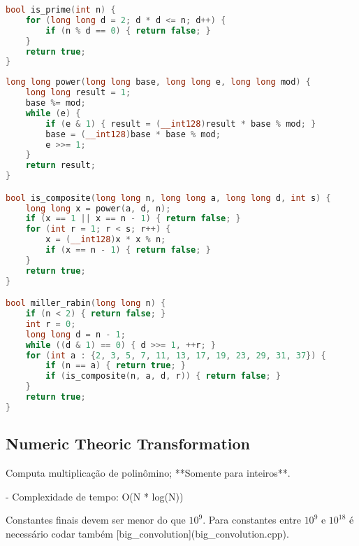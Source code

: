 \documentclass[11pt, a4paper, twoside]{article}
\begin{document}
\begin{multicols}{2}
\begin{lstlisting}[language=C++]
bool is_prime(int n) {
    for (long long d = 2; d * d <= n; d++) {
        if (n % d == 0) { return false; }
    }
    return true;
}
\end{lstlisting}
\end{multicols}

\begin{lstlisting}[language=C++]
long long power(long long base, long long e, long long mod) {
    long long result = 1;
    base %= mod;
    while (e) {
        if (e & 1) { result = (__int128)result * base % mod; }
        base = (__int128)base * base % mod;
        e >>= 1;
    }
    return result;
}

bool is_composite(long long n, long long a, long long d, int s) {
    long long x = power(a, d, n);
    if (x == 1 || x == n - 1) { return false; }
    for (int r = 1; r < s; r++) {
        x = (__int128)x * x % n;
        if (x == n - 1) { return false; }
    }
    return true;
}

bool miller_rabin(long long n) {
    if (n < 2) { return false; }
    int r = 0;
    long long d = n - 1;
    while ((d & 1) == 0) { d >>= 1, ++r; }
    for (int a : {2, 3, 5, 7, 11, 13, 17, 19, 23, 29, 31, 37}) {
        if (n == a) { return true; }
        if (is_composite(n, a, d, r)) { return false; }
    }
    return true;
}
\end{lstlisting}

\subsection{Numeric Theoric Transformation}



Computa multiplicação de polinômino; **Somente para inteiros**.

- Complexidade de tempo: O(N * log(N))

Constantes finais devem ser menor do que $10^9$.  
Para constantes entre $10^9$ e $10^{18}$ é necessário codar também [big\_convolution](big\_convolution.cpp).
\end{document}
